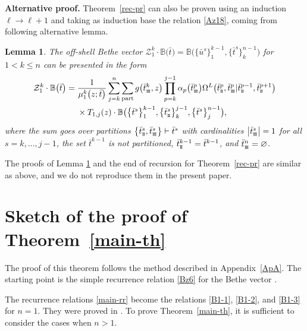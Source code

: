 \documentclass[pdftex]{sigma}
\newcommand{\st}{\scriptscriptstyle \rm I\hspace{-1pt}I}
\newcommand{\sth}{\scriptscriptstyle \rm I\hspace{-1pt}I\hspace{-1pt}I}
\newcommand{\bu}{\bar u}
\newcommand{\bt}{{\bar t}}
\newcommand{\bw}{\bar w}
\newtheorem{lem}[thm]{Lemma}
\theoremstyle{definition}
\def\BB{{\mathbb{B}}}
\def\r#1{\eqref{#1}}
\def\Z{\mathcal{Z}}
\def\Oml{\Omega^L}
\begin{document}
{\bf Alternative proof.}
Theorem~\ref{rec-pr} can also be proven using an induction $\ell\to \ell+1$ and
taking as induction base the relation \eqref{Az18}, coming from following alternative lemma.
\begin{lem}\label{r-pr}
The off-shell Bethe vector $\Z_{1}^{k}\cdot \BB\bigl(\bt\bigr)=\BB\bigl(\bigl\{\bu^s\bigr\}_1^{k-1},\bigl\{\bt^{s}\bigr\}_k^{n-1}\bigr)$ for $1<k\leq n$
can be presented in the form
\begin{align}
\Z_{1}^{k}\cdot \BB\bigl(\bt\bigr)={}&
\frac1{\mu_1^k\bigl(z;\bt\bigr)}
\sum_{j=k}^n \sum_{\rm part} g\bigl(\bt^{k}_{\sth},z\bigr)
\prod_{p=k}^{j-1}\alpha_p\bigl(\bt^p_{\sth}\bigr)
\Oml\bigl(\bt^p_{\st},\bt^p_{\sth}|\bt^{p-1}_{\st},\bt^{p+1}_{\st}\bigr)\nonumber\\
&\times T_{1,j}(z)\cdot\BB\bigl(\bigl\{\bt^s\bigr\}_1^{k-1},\bigl\{\bt^s_{\st}\bigr\}_{k}^{j-1},
\bigl\{\bt^s\bigr\}_j^{n-1}\bigr),\label{Az18}
\end{align}
where the sum goes over partitions $ \bigl\{\bt^s_{\st},\bt^s_{\sth}\bigr\}\vdash\bt^s$
with cardinalities $\big|\bt^s_{\sth}\big|=1$ for all $s=k,\dots,j-1$, the set $\bt^{k-1}$ is not partitioned, $\bt^{k-1}_{\st}=\bt^{k-1}$, and $\bt^{n}_{\sth} = \varnothing$.
\end{lem}
The proofs of Lemma \ref{r-pr} and the end of recursion for Theorem~\ref{rec-pr} are similar as above, and we do not reproduce them in the present paper.

\section[Sketch of the proof of Theorem 4.1]{Sketch of the proof of Theorem~\ref{main-th}}\label{ApB}

The proof of this theorem follows the method
described in Appendix~\ref{ApA}. The starting point is the simple
recurrence relation \r{Bz6} for the Bethe vector \smash{$\BB\bigl(\bigl\{\bw^s\bigr\}_0^{n-1}\bigr)$}.

The recurrence relations \r{main-rr} become the relations \r{B1-1}, \r{B1-2}, and
\r{B1-3} for $n=1$. They were proved in \cite{LPRS19}. To prove Theorem~\ref{main-th}, it is sufficient to consider the cases when $n>1$.
\end{document}
